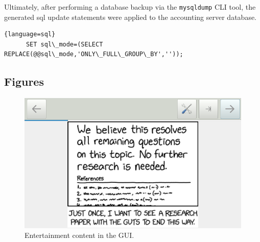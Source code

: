 \documentclass[12pt]{article}
\begin{document}
Ultimately, after performing a database backup via the \texttt{mysqldump} CLI tool, the generated sql update statements were applied to the accounting server database.

\begin{lstlisting}{language=sql}
      SET sql\_mode=(SELECT REPLACE(@@sql\_mode,'ONLY\_FULL\_GROUP\_BY',''));
\end{lstlisting}

\subsection{Figures}
\label{sec:figures}
\begin{figure}[H]
\centering
\includegraphics[width=\textwidth]{./images/entertainment.png}
\caption{Entertainment content in the GUI.}
\end{figure}
\end{document}
